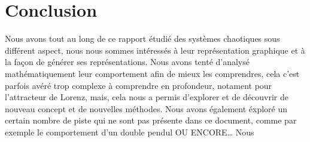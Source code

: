 \chapter{Conclusion}

Nous avons tout au long de ce rapport étudié des systèmes chaotiques
sous différent aspect, nous nous sommes intéressés à leur représentation
graphique et à la façon de générer ses représentations. Nous avons tenté d'analysé mathématiquement leur comportement
afin de mieux les comprendres, cela c'est parfois avéré trop complexe 
à comprendre en profondeur, notament pour l'attracteur de Lorenz, mais,
cela nous a permis d'explorer et de découvrir de nouveau concept et de 
nouvelles méthodes. Nous avons également éxploré un certain nombre de piste qui ne sont
pas présente dans ce document, comme par exemple le comportement d'un double pendul OU ENCORE\dots
Nous 